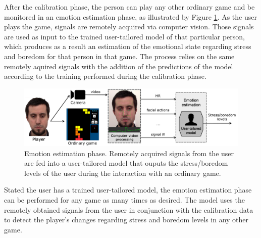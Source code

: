 After the calibration phase, the person can play any other ordinary game and be monitored in an emotion estimation phase, as illustrated by Figure \ref{fig:user-tailored-use}. As the user plays the game, signals are remotely acquired via computer vision. Those signals are used as input to the trained user-tailored model of that particular person, which produces as a result an estimation of the emotional state regarding stress and boredom for that person in that game. The process relies on the same remotely aquired signals with the addition of the predictions of the model according to the training performed during the calibration phase.

\begin{figure}[h]
    \centering
    \includegraphics[width=\textwidth]{figures/user-tailored-use.png}
    \caption{Emotion estimation phase. Remotely acquired signals from the user are fed into a user-tailored model that ouputs the stress/boredom levels of the user during the interaction with an ordinary game.}
    \label{fig:user-tailored-use}
\end{figure}

Stated the user has a trained user-tailored model, the emotion estimation phase can be performed for any game as many times as desired. The model uses the remotely obtained signals from the user in conjunction with the calibration data to detect the player's changes regarding stress and boredom levels in any other game.

